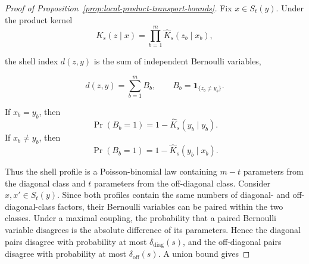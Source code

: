 \documentclass[a4paper,onecolumn,11pt,unpublished]{quantumarticle}
\theoremstyle{remark}
\begin{document}
\begin{proof}[Proof of Proposition~\ref{prop:local-product-transport-bounds}] 
Fix \(x\in S_t(y)\). Under the product kernel 
\[ K_s(z\mid x) = \prod_{b=1}^{m} \widehat K_s(z_b\mid x_b), 
\] 

the shell index \(d(z,y)\) is the sum of independent Bernoulli variables, 

\[ d(z,y) = \sum_{b=1}^{m}B_b, \qquad B_b=\mathbf 1_{\{z_b\neq y_b\}}.
\] 

If \(x_b=y_b\), then \[ \Pr(B_b=1) = 1-\widehat K_s(y_b\mid y_b). \] If \(x_b\neq y_b\), then 
\[ \Pr(B_b=1) = 1-\widehat K_s(y_b\mid x_b).
\] 

Thus the shell profile is a Poisson-binomial law containing \(m-t\) parameters from the diagonal class and \(t\) parameters from the off-diagonal class. Consider \(x,x'\in S_t(y)\). Since both profiles contain the same numbers of diagonal- and off-diagonal-class factors, their Bernoulli variables can be paired within the two classes. Under a maximal coupling, the probability that a paired Bernoulli variable disagrees is the absolute difference of its parameters. Hence the diagonal pairs disagree with probability at most \(\delta_{\mathrm{diag}}(s)\), and the off-diagonal pairs disagree with probability at most \(\delta_{\mathrm{off}}(s)\). A union bound gives 

\end{proof}
\end{document}
